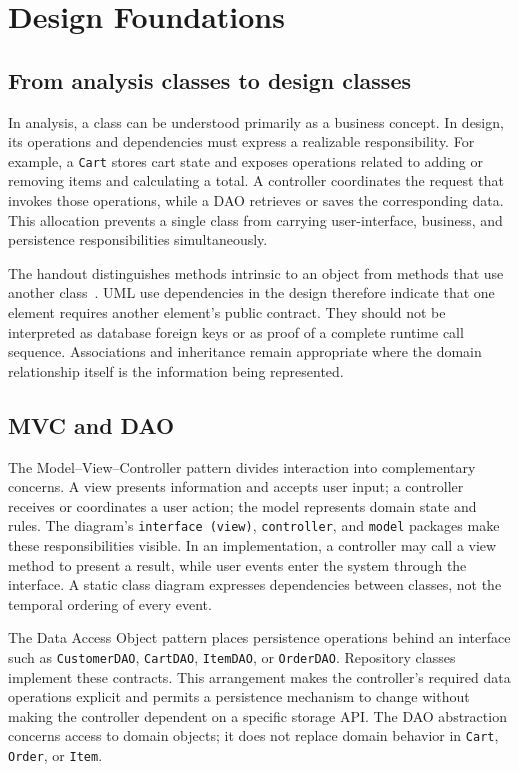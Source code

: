 \documentclass[12pt,a4paper,oneside]{report}
\begin{document}
\chapter{Design Foundations}
\section{From analysis classes to design classes}
In analysis, a class can be understood primarily as a business concept. In design, its operations and dependencies must express a realizable responsibility. For example, a \texttt{Cart} stores cart state and exposes operations related to adding or removing items and calculating a total. A controller coordinates the request that invokes those operations, while a DAO retrieves or saves the corresponding data. This allocation prevents a single class from carrying user-interface, business, and persistence responsibilities simultaneously.

The handout distinguishes methods intrinsic to an object from methods that use another class~\cite{handout}. UML use dependencies in the design therefore indicate that one element requires another element's public contract. They should not be interpreted as database foreign keys or as proof of a complete runtime call sequence. Associations and inheritance remain appropriate where the domain relationship itself is the information being represented.

\section{MVC and DAO}
The Model--View--Controller pattern divides interaction into complementary concerns. A view presents information and accepts user input; a controller receives or coordinates a user action; the model represents domain state and rules. The diagram's \texttt{interface (view)}, \texttt{controller}, and \texttt{model} packages make these responsibilities visible. In an implementation, a controller may call a view method to present a result, while user events enter the system through the interface. A static class diagram expresses dependencies between classes, not the temporal ordering of every event.

The Data Access Object pattern places persistence operations behind an interface such as \texttt{CustomerDAO}, \texttt{CartDAO}, \texttt{ItemDAO}, or \texttt{OrderDAO}. Repository classes implement these contracts. This arrangement makes the controller's required data operations explicit and permits a persistence mechanism to change without making the controller dependent on a specific storage API. The DAO abstraction concerns access to domain objects; it does not replace domain behavior in \texttt{Cart}, \texttt{Order}, or \texttt{Item}.
\end{document}
